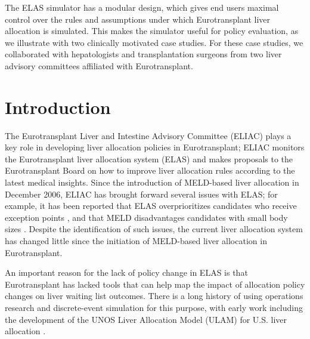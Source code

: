 \documentclass[11pt,twoside,]{book}
\begin{document}
The ELAS simulator has a modular design, which gives end users maximal
control over the rules and assumptions under which Eurotransplant
liver allocation is simulated. This makes the simulator useful for
policy evaluation, as we illustrate with two clinically motivated
case studies. For these case studies, we collaborated with hepatologists and
transplantation surgeons from two liver advisory committees affiliated
with Eurotransplant.

\newpage
\normalsize

\section{Introduction}\label{introduction-2}

The Eurotransplant Liver and Intestine Advisory Committee (ELIAC) plays a key
role in developing liver allocation policies in Eurotransplant; ELIAC
monitors the Eurotransplant liver allocation system (ELAS) and makes proposals
to the Eurotransplant Board on how to improve liver allocation rules
according to the latest medical insights. Since the introduction of MELD-based liver
allocation in December 2006, ELIAC has brought forward several issues with ELAS; for
example, it has been reported that ELAS overprioritizes candidates who receive
exception points \citep{umgelterDisparitiesEurotransplantLiver2017a}, and that MELD
disadvantages candidates with small body sizes
\citep{Sneiders2023}.
Despite the identification of such issues, the current liver allocation
system has changed little since the initiation of MELD-based liver
allocation in Eurotransplant.

An important reason for the lack of policy change in ELAS is that Eurotransplant
has lacked tools that can help map the impact of allocation policy changes on liver
waiting list outcomes. There is a long history of using operations research and
discrete-event simulation for this purpose, with early work including the development of the UNOS
Liver Allocation Model (ULAM) for U.S. liver allocation \citep{Pritsker1995}.
\end{document}
